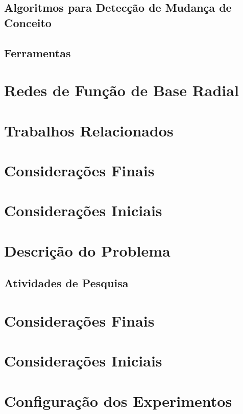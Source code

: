 \documentclass[qual, classic, a4paper]{ufbathesis}
\begin{document}
\subsection{Algoritmos para Detecção de Mudança de Conceito}
\blindtext

\subsection{Ferramentas}
\blindtext

\section{Redes de Função de Base Radial}

\section{Trabalhos Relacionados}
\blindtext

\section{Considerações Finais}
\blindtext

 \label{plano_pesquisa}
\section{Considerações Iniciais}
\blindtext

\section{Descrição do Problema}
\blindtext

\subsection{Atividades de Pesquisa}
\blindtext

\section{Considerações Finais}
\blindtext

 \label{experimentos_iniciais}
\section{Considerações Iniciais}
\blindtext

\section{Configuração dos Experimentos}
\blindtext
\end{document}
